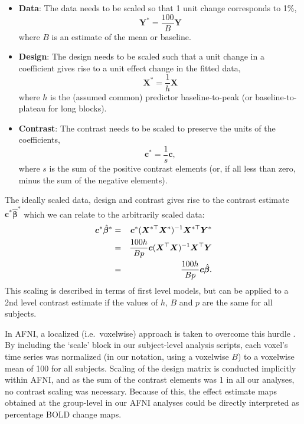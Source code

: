 \begin{itemize}
\item {\bf Data}: The data needs to be scaled so that 1 unit change corresponds to 1\%, 
\begin{equation}
\label{eq:SC_sup_data_scale}
\bm{Y}^{*} = \frac{100}{B} \bm{Y}
\end{equation}
where $B$ is an estimate of the mean or baseline.
\item {\bf Design}:  The design needs to be scaled such that a unit change in a coefficient gives rise to a unit effect change in the fitted data, 
\begin{equation}
\label{eq:SC_sup_design_scale}
\bm{X}^{*} = \frac{1}{h} \bm{X}
\end{equation}
where $h$ is the (assumed common) predictor baseline-to-peak (or baseline-to-plateau for long blocks).
\item {\bf Contrast}: The contrast needs to be scaled to preserve the units of the coefficients, 
\begin{equation}
\label{eq:SC_sup_contrast_scale}
\bm{c}^*=\frac{1}{s}\bm{c},
\end{equation}
where $s$ is the sum of the positive contrast elements (or, if all less than zero, minus the sum of the negative elements).
\end{itemize}

  The ideally scaled data, design and contrast gives rise to the contrast estimate $\bm{c}^*\hat{\bm{\beta}}^*$ which we can relate to the arbitrarily scaled data:
\begin{eqnarray}
\label{eq:SC_sup_ideal_scale}
\bm{c}^*\hat{\bm{\beta}}^* &=& \bm{c}^*(\bm{X}^{*\top}\bm{X}^*)^{-1}\bm{X}^{*\top}\bm{Y}^* \notag\\
                          &=& \frac{100h}{Bp}\bm{c}(\bm{X}^{\top}\bm{X})^{-1}\bm{X}^{\top}\bm{Y} \notag\\
                          &=& \frac{100h}{Bp}\bm{c}\hat{\bm{\beta}}.
\end{eqnarray}
This scaling is described in terms of first level models, but can be applied to a 2nd level contrast estimate if the values of $h$, $B$ and $p$ are the same for all subjects.

In AFNI, a localized (i.e.\ voxelwise) approach is taken to overcome this hurdle \citep{Chen2017-sb}. By including the `scale' block in our subject-level analysis scripts, each voxel's time series was normalized (in our notation, using a voxelwise $B$) to a voxelwise mean of 100 for all subjects. Scaling of the design matrix is conducted implicitly within AFNI, and as the sum of the contrast elements was 1 in all our analyses, no contrast scaling was necessary. Because of this, the effect estimate maps obtained at the group-level in our AFNI analyses could be directly interpreted as percentage BOLD change maps. 

